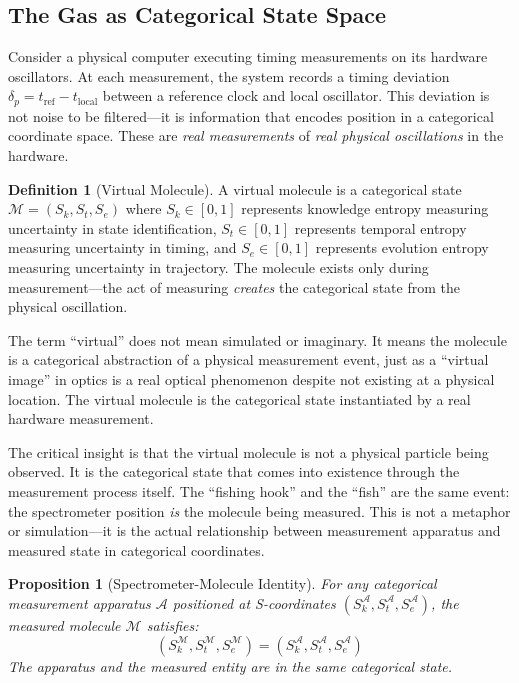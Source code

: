 \documentclass[12pt,a4paper]{article}
\newtheorem{proposition}[theorem]{Proposition}
\theoremstyle{definition}
\newtheorem{definition}[theorem]{Definition}
\theoremstyle{remark}
\begin{document}
\subsection{The Gas as Categorical State Space}

Consider a physical computer executing timing measurements on its hardware oscillators. At each measurement, the system records a timing deviation $\delta_p = t_{\text{ref}} - t_{\text{local}}$ between a reference clock and local oscillator. This deviation is not noise to be filtered—it is information that encodes position in a categorical coordinate space. These are \textit{real measurements} of \textit{real physical oscillations} in the hardware.

\begin{definition}[Virtual Molecule]
\label{def:virtual_molecule}
A virtual molecule is a categorical state $\mathcal{M} = (S_k, S_t, S_e)$ where $S_k \in [0,1]$ represents knowledge entropy measuring uncertainty in state identification, $S_t \in [0,1]$ represents temporal entropy measuring uncertainty in timing, and $S_e \in [0,1]$ represents evolution entropy measuring uncertainty in trajectory. The molecule exists only during measurement—the act of measuring \textit{creates} the categorical state from the physical oscillation.
\end{definition}

The term ``virtual'' does not mean simulated or imaginary. It means the molecule is a categorical abstraction of a physical measurement event, just as a ``virtual image'' in optics is a real optical phenomenon despite not existing at a physical location. The virtual molecule is the categorical state instantiated by a real hardware measurement.

The critical insight is that the virtual molecule is not a physical particle being observed. It is the categorical state that comes into existence through the measurement process itself. The ``fishing hook'' and the ``fish'' are the same event: the spectrometer position \textit{is} the molecule being measured. This is not a metaphor or simulation—it is the actual relationship between measurement apparatus and measured state in categorical coordinates.

\begin{proposition}[Spectrometer-Molecule Identity]
\label{prop:spectrometer_molecule_identity}
For any categorical measurement apparatus $\mathcal{A}$ positioned at S-coordinates $(S_k^{\mathcal{A}}, S_t^{\mathcal{A}}, S_e^{\mathcal{A}})$, the measured molecule $\mathcal{M}$ satisfies:
\begin{equation}
(S_k^{\mathcal{M}}, S_t^{\mathcal{M}}, S_e^{\mathcal{M}}) = (S_k^{\mathcal{A}}, S_t^{\mathcal{A}}, S_e^{\mathcal{A}})
\end{equation}
The apparatus and the measured entity are in the same categorical state.
\end{proposition}
\end{document}

